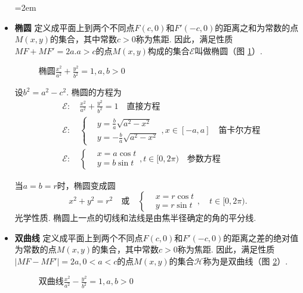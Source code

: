\begin{itemize} \parindent=2em
  \item {\bfseries 椭圆} 定义成平面上到两个不同点$F(c,0)$和$F'(-c,0)$的距离之和为常数的点$M(x,y)$的集合，其中常数$c>0$称为{\kaishu 焦距}. 因此，满足性质$MF+MF'=2a.a>c$的点$M(x,y)$构成的集合$\mathscr E$叫做椭圆（图 \ref{fig6.1}）.
      \begin{figure}[!ht]
        \centering
        
        \caption{椭圆$\frac{x^2}{a^2}+\frac{y^2}{b^2}=1,a,b>0$}\label{fig6.1}
      \end{figure}

      设$b^2=a^2-c^2$. 椭圆的方程为
      \begin{align*}
        & \mathscr E:\quad \frac{x^2}{a^2} + \frac{y^2}{b^2} = 1\quad \text{直接方程} \\
        & \mathscr E:\quad \left\{
           \begin{aligned}
             & y = \frac ba \sqrt{a^2 - x^2} \\
             & y = -\frac ba \sqrt{a^2 - x^2}
           \end{aligned}
           \right.,x\in[-a,a]\quad \text{笛卡尔方程} \\
        & \mathscr E:\quad \left\{
            \begin{aligned}
              & x = a\cos t \\
              & y = b\sin t
            \end{aligned}
          \right.,t\in[0,2\pi) \quad \text{参数方程}
      \end{align*}

     当$a=b=r$时，椭圆变成圆
     \[
       x^2 + y^2 = r^2 \quad \text{或} \quad
       \left\{
         \begin{aligned}
           & x = r \cos t \\
           & y = r \sin t
         \end{aligned}
       \right.,\quad t\in[0,2\pi).
     \]
     {\kaishu 光学性质.} 椭圆上一点的切线和法线是由{\kaishu 焦半径}确定的角的平分线.
  \item {\bfseries 双曲线} 定义成平面上到两个不同点$F(c,0)$和$F'(-c,0)$的距离之差的绝对值为常数的点$M(x,y)$的集合，其中常数$c>0$称为{\kaishu 焦距}. 因此，满足性质$|MF-MF'|=2a,0<a<c$的点$M(x,y)$的集合$\mathscr H$称为是双曲线（图 \ref{fig6.2}）.
      \begin{figure}[!ht]
        \centering
        
        \caption{双曲线$\frac{x^2}{a^2}-\frac{y^2}{b^2}=1,a,b>0$}\label{fig6.2}
      \end{figure}


\end{itemize}

